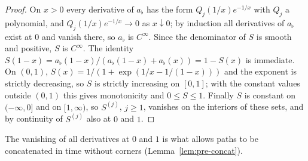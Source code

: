 \begin{proof}
On $x>0$ every derivative of $a_\flat$ has the form $Q_j(1/x)e^{-1/x}$ with $Q_j$ a polynomial, and
$Q_j(1/x)e^{-1/x}\to0$ as $x\downarrow0$; by induction all derivatives of $a_\flat$ exist at $0$ and vanish there,
so $a_\flat$ is $C^\infty$. Since the denominator of $S$ is smooth and positive, $S$ is $C^\infty$. The identity
$S(1-x)=a_\flat(1-x)/(a_\flat(1-x)+a_\flat(x))=1-S(x)$ is immediate. On $(0,1)$,
$S(x)=1/(1+\exp(1/x-1/(1-x)))$ and the exponent is strictly decreasing, so $S$ is strictly increasing on
$[0,1]$; with the constant values outside $(0,1)$ this gives monotonicity and $0\le S\le1$. Finally $S$ is
constant on $(-\infty,0]$ and on $[1,\infty)$, so $S^{(j)}$, $j\ge1$, vanishes on the interiors of these sets, and
by continuity of $S^{(j)}$ also at $0$ and $1$.
\end{proof}

The vanishing of all derivatives at $0$ and $1$ is what allows paths to be concatenated in time without
corners (Lemma~\ref{lem:pre-concat}).

